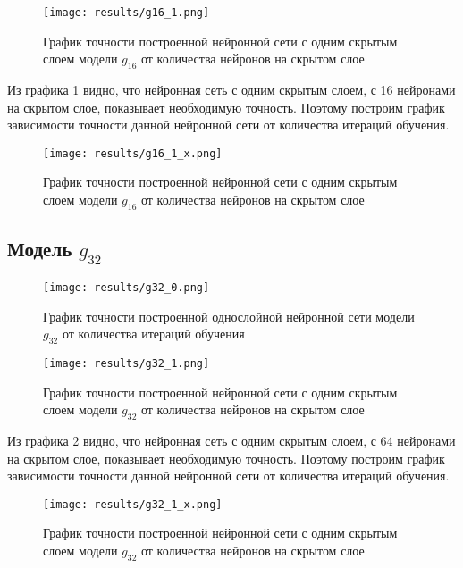 \begin{figure}[H]
	\texttt{[image: results/g16\_1.png]}
	
	\caption{График точности построенной нейронной сети с одним скрытым слоем модели $g_{16}$ от количества нейронов на скрытом слое}
	\label{graphic16}
\end{figure}

Из графика \ref{graphic16} видно, что нейронная сеть с одним скрытым слоем, с 16 нейронами на скрытом слое, показывает необходимую точность. Поэтому построим график зависимости точности данной нейронной сети от количества итераций обучения.

\begin{figure}[H]
	\texttt{[image: results/g16\_1\_x.png]}
	
	\caption{График точности построенной нейронной сети с одним скрытым слоем модели $g_{16}$ от количества нейронов на скрытом слое}
\end{figure}

\subsection{Модель $g_{32}$}
\begin{figure}[H]
	\texttt{[image: results/g32\_0.png]}
	
	\caption{График точности построенной однослойной нейронной сети модели $g_{32}$ от количества итераций обучения}
	
\end{figure}


\begin{figure}[H]
	\texttt{[image: results/g32\_1.png]}
	
	\caption{График точности построенной нейронной сети с одним скрытым слоем модели $g_{32}$ от количества нейронов на скрытом слое}
	\label{graphic32}
\end{figure}

Из графика \ref{graphic32} видно, что нейронная сеть с одним скрытым слоем, с 64 нейронами на скрытом слое, показывает необходимую точность. Поэтому построим график зависимости точности данной нейронной сети от количества итераций обучения.

\begin{figure}[H]
	\texttt{[image: results/g32\_1\_x.png]}
	
	\caption{График точности построенной нейронной сети с одним скрытым слоем модели $g_{32}$ от количества нейронов на скрытом слое}
\end{figure}

